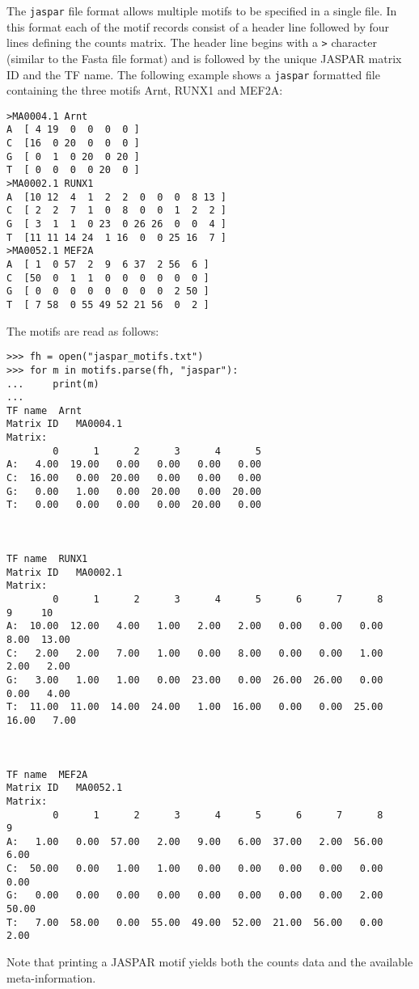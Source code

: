 The \verb+jaspar+ file format allows multiple motifs to be specified in a single file. In this format each of the motif records consist of a header line followed by four lines defining the counts matrix. The header line begins with a \verb+>+ character (similar to the Fasta file format) and is followed by the unique JASPAR matrix ID and the TF name. The following example shows a \verb+jaspar+ formatted file containing the three motifs Arnt, RUNX1 and MEF2A:
\begin{verbatim}
>MA0004.1 Arnt
A  [ 4 19  0  0  0  0 ]
C  [16  0 20  0  0  0 ]
G  [ 0  1  0 20  0 20 ]
T  [ 0  0  0  0 20  0 ]
>MA0002.1 RUNX1
A  [10 12  4  1  2  2  0  0  0  8 13 ]
C  [ 2  2  7  1  0  8  0  0  1  2  2 ]
G  [ 3  1  1  0 23  0 26 26  0  0  4 ]
T  [11 11 14 24  1 16  0  0 25 16  7 ]
>MA0052.1 MEF2A
A  [ 1  0 57  2  9  6 37  2 56  6 ]
C  [50  0  1  1  0  0  0  0  0  0 ]
G  [ 0  0  0  0  0  0  0  0  2 50 ]
T  [ 7 58  0 55 49 52 21 56  0  2 ]
\end{verbatim}
The motifs are read as follows:
\begin{verbatim}
>>> fh = open("jaspar_motifs.txt")
>>> for m in motifs.parse(fh, "jaspar"):
...     print(m)
...
TF name	 Arnt
Matrix ID	MA0004.1
Matrix:
        0      1      2      3      4      5
A:   4.00  19.00   0.00   0.00   0.00   0.00
C:  16.00   0.00  20.00   0.00   0.00   0.00
G:   0.00   1.00   0.00  20.00   0.00  20.00
T:   0.00   0.00   0.00   0.00  20.00   0.00



TF name	 RUNX1
Matrix ID	MA0002.1
Matrix:
        0      1      2      3      4      5      6      7      8      9     10
A:  10.00  12.00   4.00   1.00   2.00   2.00   0.00   0.00   0.00   8.00  13.00
C:   2.00   2.00   7.00   1.00   0.00   8.00   0.00   0.00   1.00   2.00   2.00
G:   3.00   1.00   1.00   0.00  23.00   0.00  26.00  26.00   0.00   0.00   4.00
T:  11.00  11.00  14.00  24.00   1.00  16.00   0.00   0.00  25.00  16.00   7.00



TF name	 MEF2A
Matrix ID	MA0052.1
Matrix:
        0      1      2      3      4      5      6      7      8      9
A:   1.00   0.00  57.00   2.00   9.00   6.00  37.00   2.00  56.00   6.00
C:  50.00   0.00   1.00   1.00   0.00   0.00   0.00   0.00   0.00   0.00
G:   0.00   0.00   0.00   0.00   0.00   0.00   0.00   0.00   2.00  50.00
T:   7.00  58.00   0.00  55.00  49.00  52.00  21.00  56.00   0.00   2.00
\end{verbatim}

Note that printing a JASPAR motif yields both the counts data and the available meta-information.

